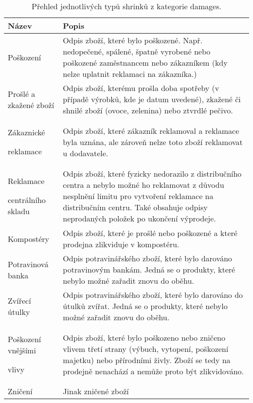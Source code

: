 \begin{table}[hbtp!]
    \caption{Přehled jednotlivých typů shrinků z kategorie damages.}
    \label{tab:sh:dam}
    \begin{tabular}{ p{4cm} p{10.5cm}}
         Název             & Popis \\
    \hline
                Poškození               & Odpis zboží, které bylo poškozené. Např. nedopečené, spálené, špatně vyrobené nebo poškozené zaměstnancem nebo zákazníkem (kdy nelze uplatnit reklamaci na zákazníka.)       \\
                Prošlé a zkažené zboží  & Odpis zboží, kterému prošla doba spotřeby (v případě výrobků, kde je datum uvedené), zkažené či shnilé zboží (ovoce, zelenina) nebo ztvrdlé pečivo.       \\
                Zákaznické \par reklamace \strut  & Odpis zboží, které zákazník reklamoval a reklamace byla uznána, ale zároveň nelze toto zboží reklamovat u dodavatele.      \\
                Reklamace \par centrálního skladu \strut   &  Odpis zboží, které fyzicky nedorazilo z distribučního centra a nebylo možné ho reklamovat z důvodu nesplnění limitu pro vytvoření reklamace na distribučním centru. Také obsahuje odpisy neprodaných položek po ukončení výprodeje.     \\
                Kompostéry              & Odpis zboží, které je prošlé nebo poškozené a které prodejna zlikviduje v kompostéru.       \\
                Potravinová banka       & Odpis potravinářského zboží, které bylo darováno potravinovým bankám. Jedná se o produkty, které nebylo možné zařadit znovu do oběhu.    \\
                Zvířecí útulky          & Odpis potravinářského zboží, které bylo darováno do útulků zvířat. Jedná se o produkty, které nebylo možné zařadit znovu do oběhu.          \\
                Poškození vnějšími \par vlivy \strut %
                                        & Odpis zboží, které bylo poškozeno nebo zničeno vlivem třetí strany (výbuch, vytopení, poškození majetku) nebo přírodními živly. Zboží se tedy na prodejně nenachází a nemůže proto být zlikvidováno.      \\
                Zničení & Jinak zničené zboží \\
    \end{tabular}
\end{table}


